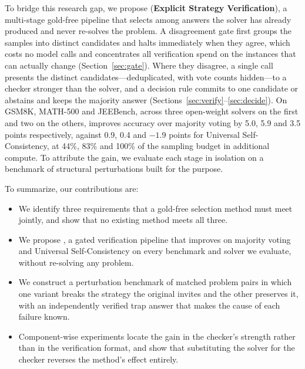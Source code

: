 To bridge this research gap, we propose \textbf{\method{}} (\textbf{Explicit Strategy
Verification}), a multi-stage gold-free pipeline that selects among answers the
solver has already produced and never re-solves the problem. A disagreement
gate first groups the samples into distinct candidates and halts immediately
when they agree, which costs no model calls and concentrates all verification
spend on the instances that can actually change
(Section~\ref{sec:gate}). Where they disagree, a single call presents the
distinct candidates---deduplicated, with vote counts hidden---to a checker
stronger than the solver, and a decision rule commits to one candidate or
abstains and keeps the majority answer (Sections~\ref{sec:verify}--\ref{sec:decide}). On
GSM8K, MATH-500 and JEEBench, across three open-weight solvers on the first and
two on the others, \method{} improves accuracy over majority voting by 5.0, 5.9
and 3.5 points respectively, against 0.9, 0.4 and $-1.9$ points for Universal
Self-Consistency, at 44\%, 83\% and 100\% of the sampling budget in additional
compute. To attribute the gain, we evaluate each stage in isolation on a
benchmark of structural perturbations built for the purpose.

To summarize, our contributions are:
\begin{itemize}
  \item We identify three requirements that a gold-free selection method must
        meet jointly, and show that no existing method meets all three.
  \item We propose \method{}, a gated verification pipeline that improves on
        majority voting and Universal Self-Consistency on every benchmark and
        solver we evaluate, without re-solving any problem.
  \item We construct a perturbation benchmark of matched problem pairs in which
        one variant breaks the strategy the original invites and the other
        preserves it, with an independently verified trap answer that makes the
        cause of each failure known.
  \item Component-wise experiments locate the gain in the checker's strength
        rather than in the verification format, and show that substituting the
        solver for the checker reverses the method's effect entirely.
\end{itemize}
